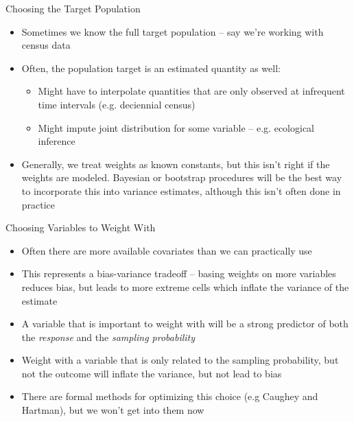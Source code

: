 \documentclass{beamer}
\begin{document}
\begin{frame}{Choosing the Target Population}
\begin{itemize} 
	\item Sometimes we know the full target population -- say we're working with census data\pause 
	\item Often, the population target is an estimated quantity as well:\pause 
	\begin{itemize}
		\item Might have to interpolate quantities that are only observed at infrequent time intervals (e.g. deciennial census)\pause 
		\item Might impute joint distribution for some variable -- e.g. ecological inference\pause 
	\end{itemize}
	\item Generally, we treat weights as known constants, but this isn't right if the weights are modeled. Bayesian or bootstrap procedures will be the best way to incorporate this into variance estimates, although this isn't often done in practice\pause 
\end{itemize}
\end{frame}


\begin{frame}{Choosing Variables to Weight With}
	\begin{itemize} 
		\item Often there are more available covariates than we can practically use\pause 
		\item This represents a bias-variance tradeoff -- basing weights on more variables reduces bias, but leads to more extreme cells which inflate the variance of the estimate \pause 
		\item A variable that is important to weight with will be a strong predictor of both the \textit{response} and the \textit{sampling probability}\pause 
		\item Weight with a variable that is only related to the sampling probability, but not the outcome will inflate the variance, but not lead to bias\pause 
		\item There are formal methods for optimizing this choice (e.g Caughey and Hartman), but we won't get into them now \pause 
	\end{itemize}
\end{frame}
\end{document}
